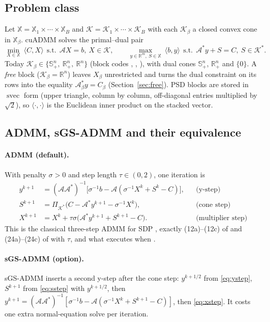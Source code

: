 \documentclass[11pt]{article}
\newcommand{\R}{\mathbb{R}}
\newcommand{\Sym}{\mathbb{S}}
\newcommand{\K}{\mathcal{K}}
\newcommand{\Kd}{\mathcal{K}^{*}}
\newcommand{\A}{\mathcal{A}}
\newcommand{\Ad}{\mathcal{A}^{*}}
\newcommand{\Proj}{\Pi}
\newcommand{\inner}[2]{\langle #1, #2\rangle}
\newcommand{\svec}{\operatorname{svec}}
\begin{document}
\subsection{Problem class}\label{sec:problem}
Let $\mathbb{X} = \mathbb{X}_1\times\cdots\times\mathbb{X}_B$ and
$\K = \K_1\times\cdots\times\K_B$ with each $\K_\beta$ a closed convex cone in $\mathbb{X}_\beta$.
cuADMM solves the primal--dual pair
\begin{equation}\label{eq:pd}
\min_{X\in\mathbb{X}}\ \inner{C}{X}\ \ \text{s.t.}\ \ \A X = b,\ X\in\K,
\qquad
\max_{y\in\R^m,\ S\in\mathbb{X}}\ \inner{b}{y}\ \ \text{s.t.}\ \ \Ad y + S = C,\ S\in\Kd .
\end{equation}
Today $\K_\beta\in\{\Sym^n_+,\ \R^n_+,\ \R^n\}$ (block codes , , ), with dual
cones $\Sym^n_+$, $\R^n_+$ and $\{0\}$. A \emph{free} block ($\K_\beta = \R^n$) leaves $X_\beta$ unrestricted
and turns the dual constraint on its rows into the equality $\A_\beta^* y = C_\beta$
(Section~\ref{sec:free}). PSD blocks are stored in $\svec$ form (upper triangle, column by column,
off-diagonal entries multiplied by $\sqrt2$), so $\inner{\cdot}{\cdot}$ is the Euclidean inner product on
the stacked vector.

\subsection{ADMM, sGS-ADMM and their equivalence}\label{sec:math-admm}

\paragraph{ADMM (default).} With penalty $\sigma>0$ and step length $\tau\in(0,2)$, one iteration is
\begin{align}
  y^{k+1}   &= (\A\Ad)^{-1}\big[\sigma^{-1}b - \A(\sigma^{-1}X^k + S^k - C)\big], && \text{(y-step)}\label{eq:ystep}\\
  S^{k+1}   &= \Proj_{\Kd}\big(C - \Ad y^{k+1} - \sigma^{-1}X^k\big), && \text{(cone step)}\label{eq:sstep}\\
  X^{k+1}   &= X^k + \tau\sigma\big(\Ad y^{k+1} + S^{k+1} - C\big). && \text{(multiplier step)}\label{eq:xstep}
\end{align}
This is the classical three-step ADMM for SDP \cite{wen}, exactly (12a)--(12c) of \cite{afterimage} and
(24a)--(24c) of \cite{composite} with $\tau$, and what  executes when
.

\paragraph{sGS-ADMM (option).} sGS-ADMM \cite{chen2017,cuadmm} inserts a second y-step after the cone
step: $y^{k+1/2}$ from \eqref{eq:ystep}, $S^{k+1}$ from \eqref{eq:sstep} with $y^{k+1/2}$, then
$y^{k+1} = (\A\Ad)^{-1}[\sigma^{-1}b - \A(\sigma^{-1}X^k + S^{k+1} - C)]$, then \eqref{eq:xstep}. It costs one
extra normal-equation solve per iteration.
\end{document}
